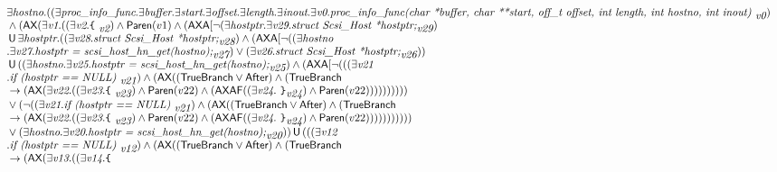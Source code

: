 \documentclass{article}
\newcommand{\U}{\,\mbox{\sf{U}}\,}
\newcommand{\A}{\mbox{\sf{A}}}
\newcommand{\AX}{\mbox{\sf{AX}}}
\newcommand{\AF}{\mbox{\sf{AF}}}
\newcommand{\mita}[1]{\mbox{\it{{#1}}}}
\newcommand{\msf}[1]{\mbox{\sf{{#1}}}}
\newcommand{\ttlb}{\mbox{\tt \char'173}}
\newcommand{\ttrb}{\mbox{\tt \char'175}}
\begin{document}
\[\begin{array}{l}
\exists \mita{hostno} . ((\exists \mita{proc\_info\_func} . \exists \mita{buffer} . \exists \mita{start} . \exists \mita{offset} . \exists \mita{length} . \exists \mita{inout} . \exists \mita{v0} . \mita{proc\_info\_func(char *buffer, char **start, off\_t offset, int length,
               int hostno, int inout) }_{\mita{v0}})\\\mbox{} \wedge (\AX(\exists \mita{v1} . ((\exists \mita{v2} . \mita{{\ttlb}
  }_{\mita{v2}}) \wedge \msf{Paren}(v1) \wedge (\AX\A[\neg (\exists \mita{hostptr} . \exists \mita{v29} . \mita{struct Scsi\_Host *hostptr;}_{\mita{v29}})\\\mbox{} \U \exists \mita{hostptr} . ((\exists \mita{v28} . \mita{struct Scsi\_Host *hostptr;}_{\mita{v28}}) \wedge (\AX\A[\neg ((\exists \mita{hostno}\\\mbox{} . \exists \mita{v27} . \mita{hostptr = scsi\_host\_hn\_get(hostno);}_{\mita{v27}}) \vee (\exists \mita{v26} . \mita{struct Scsi\_Host *hostptr;}_{\mita{v26}}))\\\mbox{} \U ((\exists \mita{hostno} . \exists \mita{v25} . \mita{hostptr = scsi\_host\_hn\_get(hostno);}_{\mita{v25}}) \wedge (\AX\A[\neg (((\exists \mita{v21}\\\mbox{} . \mita{if (hostptr == NULL) }_{\mita{v21}}) \wedge (\AX((\msf{TrueBranch} \vee \msf{After}) \wedge (\msf{TrueBranch}\\\mbox{} \rightarrow (\AX(\exists \mita{v22} . ((\exists \mita{v23} . \mita{{\ttlb}
  }_{\mita{v23}}) \wedge \msf{Paren}(v22) \wedge (\AX\AF((\exists \mita{v24} . \mita{
{\ttrb}}_{\mita{v24}}) \wedge \msf{Paren}(v22))))))))))\\\mbox{} \vee (\neg ((\exists \mita{v21} . \mita{if (hostptr == NULL) }_{\mita{v21}}) \wedge (\AX((\msf{TrueBranch} \vee \msf{After}) \wedge (\msf{TrueBranch}\\\mbox{} \rightarrow (\AX(\exists \mita{v22} . ((\exists \mita{v23} . \mita{{\ttlb}
  }_{\mita{v23}}) \wedge \msf{Paren}(v22) \wedge (\AX\AF((\exists \mita{v24} . \mita{
{\ttrb}}_{\mita{v24}}) \wedge \msf{Paren}(v22)))))))))))\\\mbox{} \vee (\exists \mita{hostno} . \exists \mita{v20} . \mita{hostptr = scsi\_host\_hn\_get(hostno);}_{\mita{v20}})) \U (((\exists \mita{v12}\\\mbox{} . \mita{if (hostptr == NULL) }_{\mita{v12}}) \wedge (\AX((\msf{TrueBranch} \vee \msf{After}) \wedge (\msf{TrueBranch}\\\mbox{} \rightarrow (\AX(\exists \mita{v13} . ((\exists \mita{v14} . \mita{{\ttlb}
}
\end{array}\]
\end{document}
